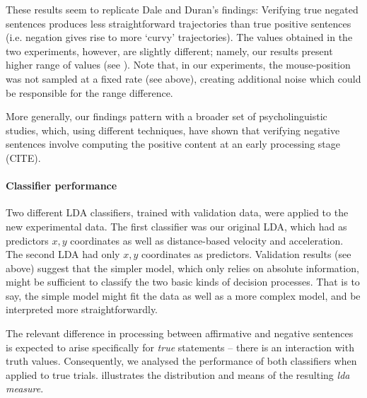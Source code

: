 \documentclass{article}
\newcommand{\nbMM}[1]{{\leavevmode\color{red}{\scriptsize#1}}}
\begin{document}
These results seem to replicate Dale and Duran's findings: Verifying true negated sentences produces less straightforward trajectories than true positive sentences (i.e. negation gives rise to more `curvy' trajectories). The values obtained in the two experiments, however, are slightly different; namely, our results present higher range of values (see ). 
Note that, in our experiments, the mouse-position was not sampled at a fixed rate (see above), creating additional noise which could be responsible for the range difference\nbMM{maybe foonote?}. 

More generally, our findings pattern with a broader set of psycholinguistic studies, which, using different techniques, have shown that verifying negative sentences involve computing the positive content at an early processing stage (CITE). 


\paragraph{Classifier performance}
Two different LDA classifiers, trained with validation data, were applied to the new experimental data. The first classifier was our original LDA, which had as predictors $x,y$ coordinates as well as distance-based velocity and acceleration. The second LDA had only $x,y$ coordinates as predictors. Validation results (see above) suggest that the simpler model, which only relies on absolute information, might be sufficient to classify the two basic kinds of decision processes. That is to say, the simple model might fit the data as well as a more complex model, and be interpreted more straightforwardly. 

The relevant difference in processing between affirmative and negative sentences is expected to arise specifically for \emph{true} statements -- there is an interaction with truth values. Consequently, we analysed the performance of both classifiers when applied to true trials.  illustrates the distribution and means of the resulting \textit{lda measure}. 
\end{document}

